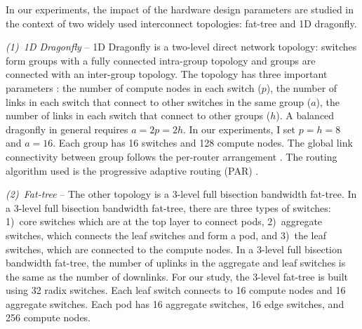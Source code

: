 \label{sec:hardwareparameters}
\vspace{0.08in}
In our experiments, the impact of the hardware design parameters are studied in the context of two 
widely used interconnect topologies: fat-tree and 1D dragonfly.

{\em (1)~1D Dragonfly} -- 1D Dragonfly \cite{Kim2008ISCA}
is a two-level direct network topology: switches form groups with a fully connected
intra-group topology and groups are connected with an inter-group topology.
The topology has three important parameters \cite{Kim2008ISCA}:
the number of compute nodes in each switch ($p$),
the number of links in each switch that connect to other switches in the same group
($a$), the number of links in each switch that connect to other groups ($h$). A balanced dragonfly
in general requires $a = 2p = 2h$. In our experiments, I set $p = h = 8$ and $a = 16$.
Each group has 16 switches and 128 compute nodes. 
The global link connectivity between group follows the per-router arrangement
\cite{Alzaid2020ICS}.
The routing algorithm used is the progressive adaptive routing (PAR) \cite{Kim2008ISCA,Alzaid2020ICS}.

{\em (2)~Fat-tree} -- The other topology is a 3-level full bisection bandwidth
fat-tree.  In a 3-level full bisection bandwidth fat-tree, there are three types
of switches: 1)~core switches which are at the top layer to connect pods,
2)~aggregate switches, which connects the leaf switches and form a pod, and
3)~the leaf switches, which are connected to the compute nodes. In a 3-level
full bisection bandwidth fat-tree, the number of uplinks in the aggregate and
leaf switches is the same as the number of downlinks. For our study, the 3-level
fat-tree is built using 32 radix switches. Each leaf switch connects to 16
compute nodes and 16 aggregate switches. Each pod has 16 aggregate switches, 16
edge switches, and 256 compute nodes.

